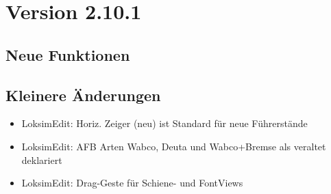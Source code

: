 \section{Version 2.10.1}
\subsection{Neue Funktionen}
\begin{itemize}
\end{itemize}


\subsection{Kleinere Änderungen}
\begin{itemize}
    \item LoksimEdit: Horiz. Zeiger (neu) ist Standard für neue Führerstände
    \item LoksimEdit: AFB Arten Wabco, Deuta und Wabco+Bremse als veraltet deklariert
    \item LoksimEdit: Drag-Geste für Schiene- und FontViews
\end{itemize}

